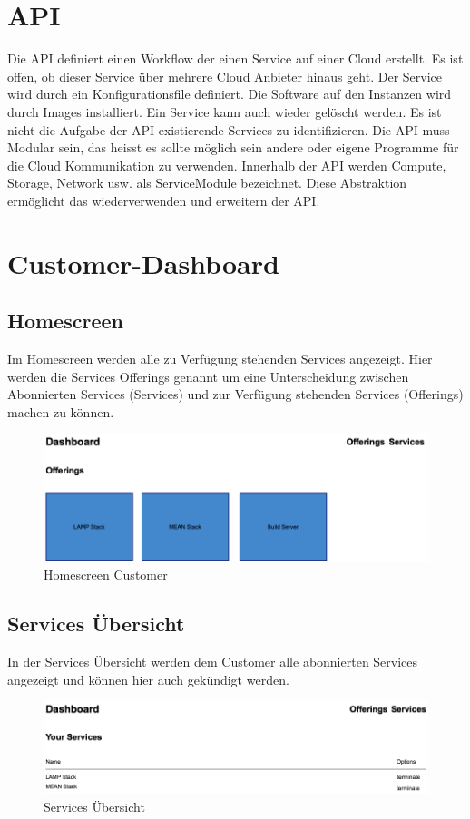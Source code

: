 \section{API}
Die API definiert einen Workflow der einen Service auf einer Cloud erstellt. Es ist offen, ob 
dieser Service über mehrere Cloud Anbieter hinaus geht. Der Service wird durch 
ein Konfigurationsfile definiert. Die Software auf den Instanzen wird durch Images installiert.
 Ein Service kann auch wieder gelöscht werden.
 Es ist nicht die Aufgabe der API existierende Services zu identifizieren. 
 Die API muss Modular sein, das heisst es sollte möglich sein andere oder eigene 
 Programme für die Cloud Kommunikation zu verwenden. Innerhalb der API 
 werden Compute, Storage, Network usw. als ServiceModule bezeichnet. 
 Diese Abstraktion ermöglicht das wiederverwenden und erweitern der API.
\newpage
\section{Customer-Dashboard}
\subsection{Homescreen}
Im Homescreen werden alle zu 
Verfügung stehenden Services angezeigt.
Hier werden die Services Offerings genannt um eine Unterscheidung zwischen 
Abonnierten Services (Services) und zur Verfügung stehenden Services (Offerings) 
machen zu können.

\begin{figure}[!htbp]
\includegraphics[width=\textwidth]{./04_Anforderungen/images/homescreen_customer}
\caption{Homescreen Customer}
\end{figure}

\subsection{Services Übersicht}
In der Services Übersicht werden dem Customer alle abonnierten Services 
angezeigt und können hier auch gekündigt werden.
\newline
\begin{figure}[!htbp]
\includegraphics[width=\textwidth]{./04_Anforderungen/images/services_overview}
\caption{Services Übersicht}
\end{figure}

